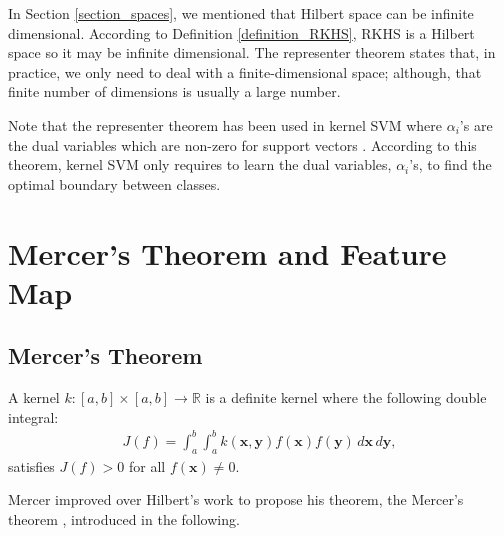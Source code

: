 \documentclass[lang=cn,10pt]{gorgeousnbook}
\numberwithin{equation}{section}%
\numberwithin{figure}{section}%
\begin{document}
\begin{corollary}
In Section \ref{section_spaces}, we mentioned that Hilbert space can be infinite dimensional. According to Definition \ref{definition_RKHS}, RKHS is a Hilbert space so it may be infinite dimensional. The representer theorem states that, in practice, we only need to deal with a finite-dimensional space; although, that finite number of dimensions is usually a large number. 
\end{corollary}

Note that the representer theorem has been used in kernel SVM where $\alpha_i$'s are the dual variables which are non-zero for support vectors \cite{boser1992training,vapnik1995nature}. According to this theorem, kernel SVM only requires to learn the dual variables, $\alpha_i$'s, to find the optimal boundary between classes. 





\section{Mercer's Theorem and Feature Map}\label{section_Mercer_theorem}

\subsection{Mercer's Theorem}

\begin{definition}
A kernel $k: [a,b] \times [a,b] \rightarrow \mathbb{R}$ is a definite kernel where the following double integral:
\begin{align}
J(f) = \int_a^b \int_a^b k(\boldsymbol{x}, \boldsymbol{y}) f(\boldsymbol{x}) f(\boldsymbol{y})\, d\boldsymbol{x}\, d\boldsymbol{y},
\end{align}
satisfies $J(f) > 0$ for all $f(\boldsymbol{x}) \neq 0$. 
\end{definition}
Mercer improved over Hilbert's work \cite{hilbert1904grundzuge} to propose his theorem, the Mercer's theorem \cite{mercer1909functions}, introduced in the following. 

\end{document}
